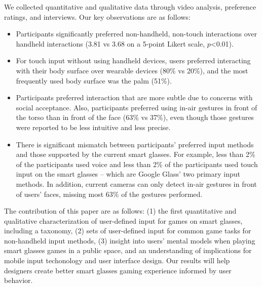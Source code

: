 \documentclass{sigchi}
\begin{document}
We collected quantitative and qualitative data through video analysis, preference ratings, and interviews. 
Our key observations are as follows:
\begin{itemize}
  \item Participants significantly preferred non-handheld, non-touch interactions over handheld interactions (3.81  vs 3.68 on a 5-point Likert scale, $p$\textless 0.01).
  \item For touch input without using handheld devices, users preferred interacting with their body surface over wearable devices (80\% vs 20\%), and the most frequently used body surface was the palm (51\%).
  \item Participants preferred interaction that are more subtle due to concerns with social acceptance. Also, participants preferred using in-air gestures in front of the torso than in front of the face (63\% vs 37\%), even though those gestures were reported to be less intuitive and less precise.
  \item There is significant mismatch between participants' preferred input methods and those supported by the current smart glasses. For example, less than 2\% of the participants used voice and less than 2\% of the participants used touch input on the smart glasses -- which are Google Glass' two primary input methods. In addition, current cameras can only detect in-air gestures in front of users' faces, missing most 63\% of the gestures performed.
\end{itemize}


 
The contribution of this paper are as follows:
(1) the first quantitative and qualitative characterization of user-defined input for games on smart glasses, including a taxonomy, 
(2) sets of user-defined input for common game tasks for non-handheld input methods, 
(3) insight into users' mental models when playing smart glasses games in a public space, and an understanding of implications for mobile input techonology and user interface design.
Our results will help designers create better smart glasses gaming experience informed by user behavior.

\end{document}
